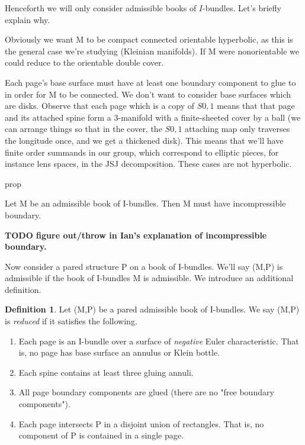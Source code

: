 \documentclass[12pt]{amsart}
\theoremstyle{definition}
\newtheorem{defn}[theorem]{Definition}
\theoremstyle{remark}
\begin{document}
Henceforth we will only consider admissible books of $I$-bundles. Let's briefly
explain why.

Obviously we want M to be compact connected orientable hyperbolic, as this is
the general case we're studying (Kleinian manifolds). If M were nonorientable
we could reduce to the orientable double cover.

Each page's base surface must have at least one boundary component to glue to
in order for M to be connected. We don't want to consider base surfaces which
are disks.  Observe that each page which is a copy of $S0,1$ means that that
page and its attached spine form a 3-manifold with a finite-sheeted cover by
a ball (we can arrange things so that in the cover, the $S0,1$ attaching map
only traverses the longitude once, and we get a thickened disk).  This means
that we'll have finite order summands in our group, which correspond to
elliptic pieces, for instance lens spaces, in the JSJ decomposition. These
cases are not hyperbolic.

prop

Let M be an admissible book of I-bundles. Then M must have incompressible
boundary.

\textbf{TODO figure out/throw in Ian's explanation of incompressible boundary.}

Now consider a pared structure P on a book of I-bundles. We'll say (M,P) is
admissible if the book of I-bundles M is admissible. We introduce an additional
definition.

\begin{defn}

Let (M,P) be a pared admissible book of I-bundles. We say (M,P) is
\emph{reduced} if it satisfies the following.

\begin{enumerate}

\item Each page is an I-bundle over a surface of \emph{negative} Euler
characteristic. That is, no page has base surface an annulus or Klein bottle.

\item Each spine contains at least three gluing annuli.

\item All page boundary components are glued (there are no "free boundary
components").

\item Each page intersects P in a disjoint union of rectangles. That is, no
component of P is contained in a single page.

\end{enumerate}

\end{defn}
\end{document}
